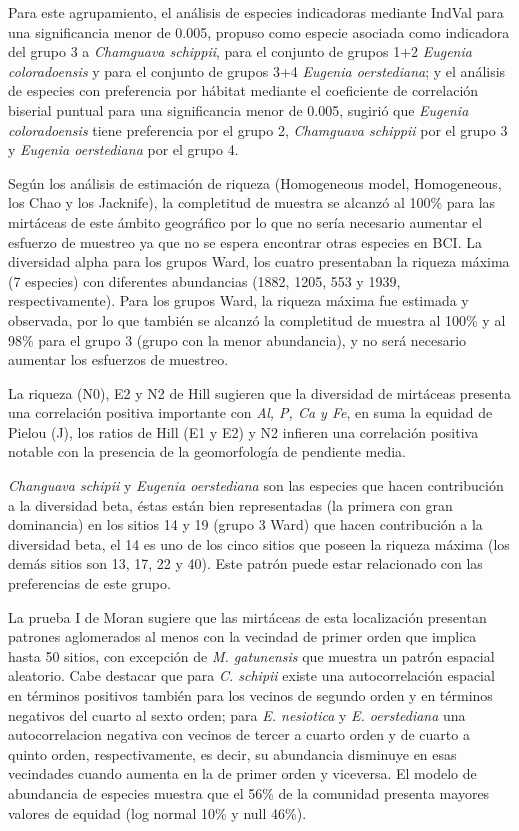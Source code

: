\documentclass[11pt,]{article}
\begin{document}
Para este agrupamiento, el análisis de especies indicadoras mediante
IndVal para una significancia menor de 0.005, propuso como especie
asociada como indicadora del grupo 3 a \emph{Chamguava schippii}, para
el conjunto de grupos 1+2 \emph{Eugenia coloradoensis} y para el
conjunto de grupos 3+4 \emph{Eugenia oerstediana}; y el análisis de
especies con preferencia por hábitat mediante el coeficiente de
correlación biserial puntual para una significancia menor de 0.005,
sugirió que \emph{Eugenia coloradoensis} tiene preferencia por el grupo
2, \emph{Chamguava schippii} por el grupo 3 y \emph{Eugenia oerstediana}
por el grupo 4.

Según los análisis de estimación de riqueza (Homogeneous model,
Homogeneous, los Chao y los Jacknife), la completitud de muestra se
alcanzó al 100\% para las mirtáceas de este ámbito geográfico por lo que
no sería necesario aumentar el esfuerzo de muestreo ya que no se espera
encontrar otras especies en BCI. La diversidad alpha para los grupos
Ward, los cuatro presentaban la riqueza máxima (7 especies) con
diferentes abundancias (1882, 1205, 553 y 1939, respectivamente). Para
los grupos Ward, la riqueza máxima fue estimada y observada, por lo que
también se alcanzó la completitud de muestra al 100\% y al 98\% para el
grupo 3 (grupo con la menor abundancia), y no será necesario aumentar
los esfuerzos de muestreo.

La riqueza (N0), E2 y N2 de Hill sugieren que la diversidad de mirtáceas
presenta una correlación positiva importante con \emph{Al, P, Ca y Fe},
en suma la equidad de Pielou (J), los ratios de Hill (E1 y E2) y N2
infieren una correlación positiva notable con la presencia de la
geomorfología de pendiente media.

\emph{Changuava schipii} y \emph{Eugenia oerstediana} son las especies
que hacen contribución a la diversidad beta, éstas están bien
representadas (la primera con gran dominancia) en los sitios 14 y 19
(grupo 3 Ward) que hacen contribución a la diversidad beta, el 14 es uno
de los cinco sitios que poseen la riqueza máxima (los demás sitios son
13, 17, 22 y 40). Este patrón puede estar relacionado con las
preferencias de este grupo.

La prueba I de Moran sugiere que las mirtáceas de esta localización
presentan patrones aglomerados al menos con la vecindad de primer orden
que implica hasta 50 sitios, con excepción de \emph{M. gatunensis} que
muestra un patrón espacial aleatorio. Cabe destacar que para \emph{C.
schipii} existe una autocorrelación espacial en términos positivos
también para los vecinos de segundo orden y en términos negativos del
cuarto al sexto orden; para \emph{E. nesiotica} y \emph{E. oerstediana}
una autocorrelacion negativa con vecinos de tercer a cuarto orden y de
cuarto a quinto orden, respectivamente, es decir, su abundancia
disminuye en esas vecindades cuando aumenta en la de primer orden y
viceversa. El modelo de abundancia de especies muestra que el 56\% de la
comunidad presenta mayores valores de equidad (log normal 10\% y null
46\%).
\end{document}
